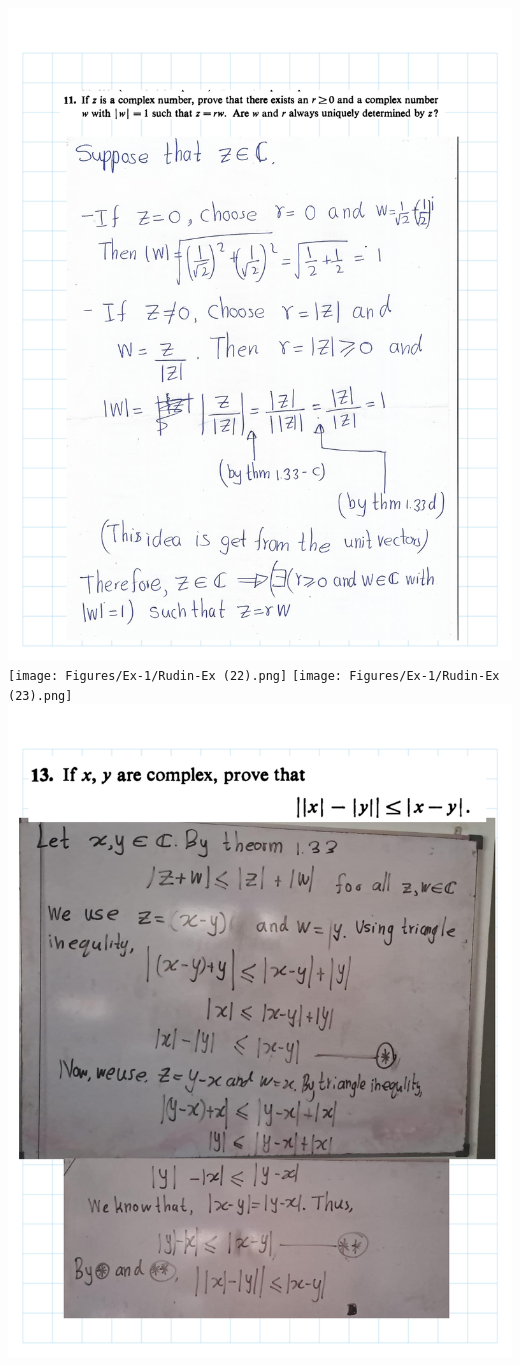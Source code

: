 \documentclass[
]{book}
\theoremstyle{definition}
\theoremstyle{definition}
\theoremstyle{definition}
\theoremstyle{definition}
\theoremstyle{remark}
\begin{document}
\includegraphics{Figures/Ex-1/Rudin-Ex (21).png}
\texttt{[image: Figures/Ex-1/Rudin-Ex (22).png]}
\texttt{[image: Figures/Ex-1/Rudin-Ex (23).png]}
\includegraphics{Figures/Ex-1/Rudin-Ex (24).png}
\end{document}
